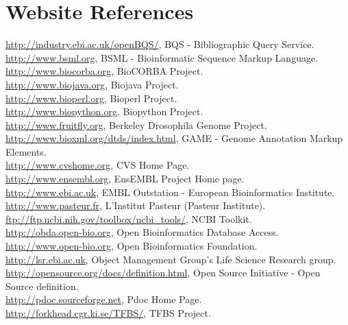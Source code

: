 \documentclass[12pt]{article}
\begin{document}
\newpage

\section{Website References}
\url{http://industry.ebi.ac.uk/openBQS/}, BQS - Bibliographic Query Service.\\
\url{http://www.bsml.org}, BSML - Bioinformatic Sequence Markup Language. \\
\url{http://www.biocorba.org}, BioCORBA Project. \\
\url{http://www.biojava.org}, Biojava Project. \\
\url{http://www.bioperl.org}, Bioperl Project. \\
\url{http://www.biopython.org}, Biopython Project. \\
\url{http://www.fruitfly.org}, Berkeley Drosophila Genome Project.\\
\url{http://www.bioxml.org/dtds/index.html},  GAME - Genome
Annotation Markup Elements. \\ 
\url{http://www.cvshome.org}, CVS Home Page. \\
\url{http://www.ensembl.org}, EnsEMBL Project Home page. \\
\url{http://www.ebi.ac.uk}, EMBL Outstation - European Bioinformatics
Institute. \\ 
\url{http://www.pasteur.fr}, L'Institut Pasteur (Pasteur Institute). \\
\url{ftp://ftp.ncbi.nih.gov/toolbox/ncbi_tools/}, NCBI Toolkit. \\
\url{http://obda.open-bio.org}, Open Bioinformatics Database Access. \\
\url{http://www.open-bio.org}, Open Bioinformatics Foundation. \\
\url{http://lsr.ebi.ac.uk}, Object Management Group's Life Science Research group. \\
\url{http://opensource.org/docs/definition.html}, Open Source
Initiative - Open Source definition. \\
\url{http://pdoc.sourceforge.net}, Pdoc Home Page. \\
\url{http://forkhead.cgr.ki.se/TFBS/}, TFBS Project. \\

\newpage 


\pagestyle{fancy}
\fancyhf{}
\renewcommand{\headrulewidth}{0pt}

\end{document}
